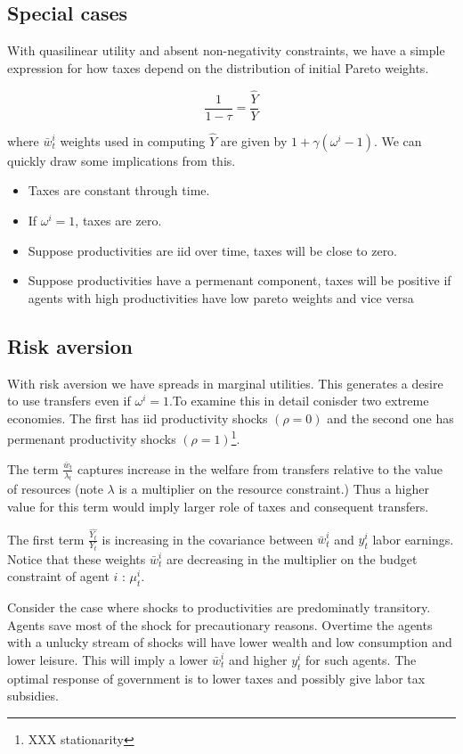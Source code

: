 \documentclass[thmsb,11pt]{article}
\begin{document}
\subsection{Special cases}
With quasilinear utility and absent non-negativity constraints, we have a simple expression for how taxes depend on the distribution of initial Pareto weights.

 
\begin{equation}
	\label{eq-ql-taxes}
\frac{1}{1-\tau}=\frac{\hat{Y}}{Y}	
\end{equation}   

where $\bar{w}^{i}_t$ weights used in computing $\hat{Y}$ are given by $1+\gamma(\omega^i-1)$. We can quickly draw some implications from this. 
\begin{itemize}
\item Taxes are constant through time.
\item If $\omega^i=1$, taxes are zero.
\item Suppose productivities are iid over time,  taxes will be close to zero.
\item Suppose productivities have a permenant component, taxes will be positive if agents with high productivities have low pareto weights and vice versa
\end{itemize}
\subsection{Risk aversion}


With risk aversion we have spreads in marginal utilities. This generates a desire to use transfers even if $\omega^i=1$.To examine this in detail conisder two extreme economies. The first has iid productivity shocks $(\rho=0)$ and the second one has permenant productivity shocks $(\rho=1)$\footnote{XXX stationarity}.


The term  $\frac{\bar{w}_t }{\lambda_t}$ captures increase in the welfare from transfers relative to the value of resources (note $\lambda$ is a multiplier on the resource constraint.) Thus a higher value for this term would imply larger role of taxes and consequent transfers. 

The first term $\frac{\hat{Y_t}}{Y_t}$ is increasing in the covariance between $\bar{w}^i_t$ and $y^i_t$ labor earnings. Notice that these weights $\bar{w}^i_t$ are decreasing in the multiplier on the budget constraint of agent $i$ : $\mu_t^i$. 

Consider the case where shocks to productivities are predominatly transitory.   Agents save most of the shock for precautionary reasons. Overtime the agents with a unlucky stream of shocks will have lower wealth and low consumption and lower leisure. This will imply a lower $\bar{w}^i_t$ and higher $y^i_t$ for such agents. The optimal response of government is to lower taxes and possibly give labor tax subsidies. 
\end{document}
